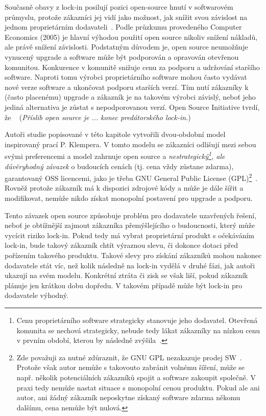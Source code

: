 \begin{multicols}{2}
	Současně obavy z lock-in posilují pozici open-source hnutí v softwarovém průmyslu, protože zákazníci jej vidí jako možnost, jak snížit svou závislost na jednom proprietárním dodavateli~\cite{opensource-advantage}. Podle průzkumu provedeného Computer Economics (2005) je hlavní výhodou použití open source nikoliv snížení nákladů, ale právě snížení závislosti. Podstatným důvodem je, open source neumožňuje vynucený upgrade a software může být podporován a opravován otevřenou komunitou. Konkurence v komunitě snižuje cenu za podporu a udržování staršího software. Naproti tomu výrobci proprietárního software mohou často vydávat nové verze software a ukončovat podporu starších verzí. Tím nutí zákazníky k (často placenému) upgrade a zákazník je na takovém výrobci závislý, neboť jeho jediná alternativa je zůstat s nepodporovanou verzí. Open Source Initiative tvrdí, že ~\cite{OSI} ({\em Příslib open source je ... konec predátorského lock-in.})

	Autoři studie popisované v této kapitole vytvořili dvou-obdobní model inspirovaný prací P. Klempera. V tomto modelu se zákazníci odlišují mezi sebou svými preferencemi a model zahrnuje open source a {\em nestrategický\footnote{Cenu proprietárního software strategicky stanovuje jeho dodavatel. Otevřená komunita se nechová strategicky, nebude tedy lákat zákazníky na nízkou cenu v prvním období, kterou by následně zvýšila~\cite[str. 2]{lock-in-competition}.}, ale důvěryhodný závazek} o budoucích cenách (tj. cena vždy zůstane zdarma), garantovaný OSS licencemi, jako je třeba GNU General Public License (GPL)\footnote{Zde považuji za nutné zdůraznit, že GNU GPL nezakazuje prodej SW~\cite{selling-foss}. Protože však autor nemůže s takovouto zabránit volnému šíření, může se např. několik potenciálních zákazníků spojit a software zakoupit společně. V praxi tedy nemůže nastat situace s monopolní cenou produktu. Pokud ale ani autor, ani žádný zákazník neposkytne získaný software zdarma někomu dalšímu, cena nemůže být nulová.}~\cite[str. 2]{lock-in-competition}. Rovněž protože zákazník má k dispozici zdrojové kódy a může je dále šířit a modifikovat, nemůže nikdo získat monopolní postavení pro upgrade a podporu.

	Tento závazek open source způsobuje problém pro dodavatele uzavřených řešení, neboť je obtížnější zajmout zákazníka přemýšlejícího o budoucnosti, který může vycícit riziko lock-in. Pokud tedy má vybrat proprietární produkt s očekáváním lock-in, bude takový zákazník chtít výraznou slevu, či dokonce dotaci před pořízením takového produktu. Takové slevy pro získání zákazníků mohou nakonec dodavatele stát víc, než kolik následně na lock-in vydělá v druhé fázi, jak autoři ukazují na svém modelu. Konkrétní ztráta či zisk se však liší, pokud zákazník plánuje jen krátkou dobu dopředu. V takovém případě může být lock-in pro dodavatele výhodný.


\end{multicols}
